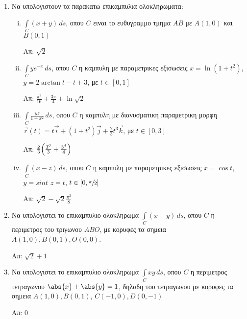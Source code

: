 


\thispagestyle{empty}
\everymath{\displaystyle}



\begin{center}
\end{center}

\vspace{\baselineskip}

\begin{enumerate} 

\item Να υπολογιστουν τα παρακατω επικαμπυλια ολοκληρωματα:

\begin{enumerate}[i)]

\item $\int\limits_C (x+y)\,ds$, οπου $C$ ειναι το ευθυγραμμο τμημα $ΑΒ$ με $A(1,0)$ και $B(0,1)$

\hfill Απ: $\sqrt{2}$



\item $\int\limits_C ye^{-x}\,ds$, οπου $C$ η καμπυλη με παραμετρικες εξισωσεις $x=\ln(1+t^2)$, $y=2\arctan t-t+3$, με $t\in [0,1]$


\hfill Απ: $\frac{\pi^2}{16}+\frac{3\pi}{4}+\ln\sqrt{2}$

\item $\int\limits_C \frac{yz}{1+x^2}\,ds$, οπου $C$ η καμπυλη με διανυσματικη παραμετρικη μορφη $\vec{r}(t)=t\vec{i}+(1+t^2)\vec{j}+\frac{2}{3}t^3\vec{k}$, με $t\in [0,3]$

\hfill Απ: $\frac{2}{3}\Bigl(\frac{3^6}{3}+\frac{3^4}{4}\Bigr)$


\item $\int\limits_C (x-z)\,ds$, οπου $C$ η καμπυλη με παραμετρικες εξισωσεις $x=\cos t$, $y=sin t$ $z=t$, $t\in[0,\sfrac{\pi}{2}]$

\hfill Απ: $\sqrt{2}-\sqrt{2}\frac{\pi^2}{8}$



\end{enumerate}

\item Να υπολογιστει το επικαμπυλιο ολοκληρωμα $\int\limits_C (x+y)\,ds$, οπου $C$ η περιμετρος του τριγωνου $ΑΒΟ$, με κορυφες τα σημεια $A(1,0), B(0,1), O(0,0)$.

\hfill Απ: $\sqrt{2}+1$



\item Να υπολογιστει το επικαμπυλιο ολοκληρωμα $\int\limits_C xy\,ds$, οπου $C$ η περιμετρος τετραγωνου $\abs{x}+\abs{y}=1$, δηλαδη του τετραγωνου με κορυφες τα σημεια $A(1,0), B(0,1)$, $C(-1,0), D(0,-1)$

\hfill Απ: $0$

\end{enumerate}

